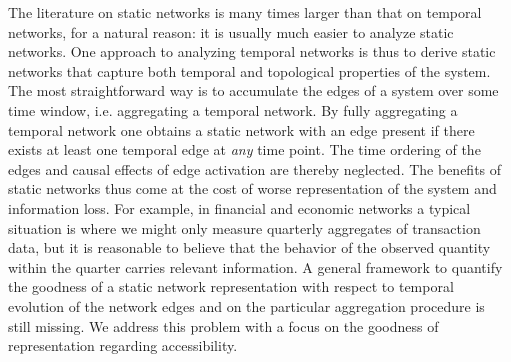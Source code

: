 \documentclass[%
 reprint,
 amsmath,amssymb,
 aps,
]{revtex4-2}
\begin{document}
The literature on static networks is many times larger than that on temporal networks, for a natural reason: it is usually much easier to analyze static networks. One approach to analyzing temporal networks is thus to derive static networks that capture both temporal and topological properties of the system. 
The most straightforward way is to accumulate the edges of a system over some time window, i.e. aggregating a temporal network.
By fully aggregating a temporal network one obtains a static  network with an edge present if there exists at least one temporal edge at \emph{any} time point. The time ordering of the edges and causal effects of edge activation are thereby neglected. 
The benefits of static networks thus come at the cost of worse representation of the system and information loss. 
For example, in financial and economic networks a typical situation is where we might only measure quarterly aggregates of transaction data, but it is reasonable to believe that the behavior of the observed quantity within the quarter carries relevant information. 
A general framework to quantify the goodness of a static network representation with respect to temporal evolution of the network edges and on the particular aggregation procedure is still missing. We address this problem with a focus on the goodness of representation regarding accessibility. 


\end{document}
